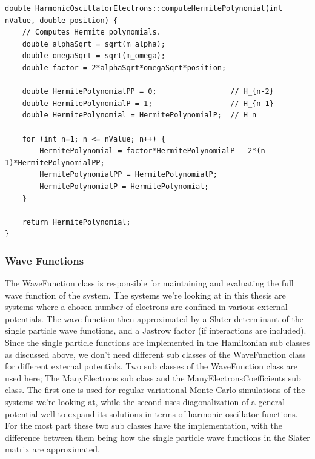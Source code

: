 \documentclass[../main.tex]{subfiles}
\begin{document}
\lstset{language=c++}
\begin{lstlisting}[caption={Recursive method for computing Hermite polynomials. This method requires the least amount of code and will work for any amount of particles in the system. However, it is also the least optimized method in terms of computation time, and it can be very time consuming when the amount of particles is high.}]
double HarmonicOscillatorElectrons::computeHermitePolynomial(int nValue, double position) {
    // Computes Hermite polynomials.
    double alphaSqrt = sqrt(m_alpha);
    double omegaSqrt = sqrt(m_omega);
    double factor = 2*alphaSqrt*omegaSqrt*position;

    double HermitePolynomialPP = 0;                 // H_{n-2}
    double HermitePolynomialP = 1;                  // H_{n-1}
    double HermitePolynomial = HermitePolynomialP;  // H_n

    for (int n=1; n <= nValue; n++) {
        HermitePolynomial = factor*HermitePolynomialP - 2*(n-1)*HermitePolynomialPP;
        HermitePolynomialPP = HermitePolynomialP;
        HermitePolynomialP = HermitePolynomial;
    }

    return HermitePolynomial;
}
\end{lstlisting}

\subsubsection{Wave Functions}

The WaveFunction class is responsible for maintaining and evaluating the full wave function of the system. The systems we're looking at in this thesis are systems where a chosen number of electrons are confined in various external potentials. The wave function then approximated by a Slater determinant of the single particle wave functions, and a Jastrow factor (if interactions are included). Since the single particle functions are implemented in the Hamiltonian sub classes as discussed above, we don't need different sub classes of the WaveFunction class for different external potentials. Two sub classes of the WaveFunction class are used here; The ManyElectrons sub class and the ManyElectronsCoefficients sub class. The first one is used for regular variational Monte Carlo simulations of the systems we're looking at, while the second uses diagonalization of a general potential well to expand its solutions in terms of harmonic oscillator functions. For the most part these two sub classes have the implementation, with the difference between them being how the single particle wave functions in the Slater matrix are approximated.
\end{document}
